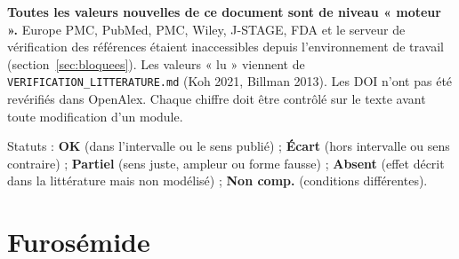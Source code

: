 \documentclass[10pt,a4paper]{article}
\newcommand{\cmd}[1]{\texttt{#1}}
\newcommand{\ok}{\textcolor{green!45!black}{\textbf{OK}}}
\newcommand{\ecart}{\textcolor{red!70!black}{\textbf{Écart}}}
\newcommand{\partiel}{\textcolor{orange!80!black}{\textbf{Partiel}}}
\newcommand{\nc}{\textcolor{black!60}{\textbf{Non comp.}}}
\newcommand{\absent}{\textcolor{red!70!black}{\textbf{Absent}}}
\begin{document}
\textbf{Toutes les valeurs nouvelles de ce document sont de niveau « moteur ».} Europe PMC, PubMed, PMC, Wiley, J-STAGE, FDA et le serveur de vérification des références étaient inaccessibles depuis l'environnement de travail (section~\ref{sec:bloquees}). Les valeurs « lu » viennent de \cmd{VERIFICATION\_LITTERATURE.md} (Koh 2021, Billman 2013). Les DOI n'ont pas été revérifiés dans OpenAlex. Chaque chiffre doit être contrôlé sur le texte avant toute modification d'un module.

Statuts : \ok{} (dans l'intervalle ou le sens publié) ; \ecart{} (hors intervalle ou sens contraire) ; \partiel{} (sens juste, ampleur ou forme fausse) ; \absent{} (effet décrit dans la littérature mais non modélisé) ; \nc{} (conditions différentes).

\section{Furosémide}
\end{document}
